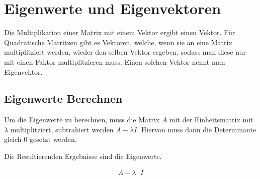 \chapter{Eigenwerte und Eigenvektoren}

Die Multiplikation einer Matrix mit einem Vektor ergibt einen Vektor. Für Quadratische Matritzen gibt es Vektoren, welche, wenn sie an eine Matrix multiplitziert werden, wieder den selben Vektor ergeben, sodass man diese nur mit einen Faktor multiplitzieren muss. Einen solchen Vektor nennt man Eigenvektor.

\section{Eigenwerte Berechnen}

Um die Eigenwerte zu berechnen, muss die Matrix $A$ mit der Einheitsmatrix mit $\lambda$ multiplitziert, subtrahiert werden $A - \lambda I$. Hiervon muss dann die Determinante gleich 0 gesetzt werden.

Die Resultierenden Ergebnisse sind die Eigenwerte.

\begin{align*}
    A - \lambda \cdot I
\end{align*}